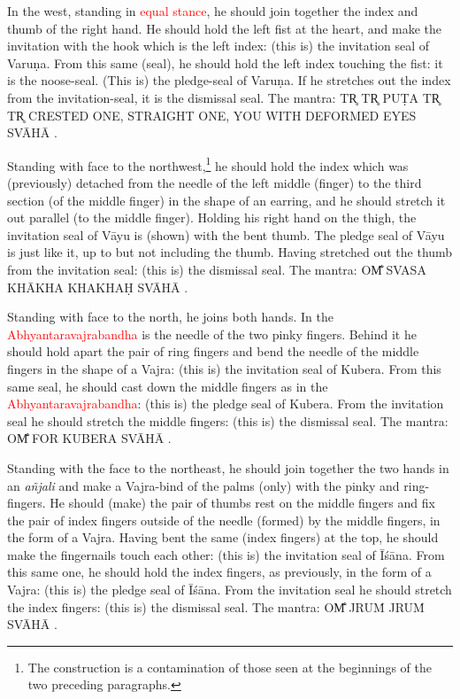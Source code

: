 \documentclass[11pt]{book}
\makeatletter
\def\fakesc#1{%
  \begingroup%
  \xdef\fake@name{\csname\curr@fontshape/\f@size\endcsname}%
  \fontsize{1.3\fontdimen8\fake@name}{\baselineskip}\selectfont%
  \uppercase{#1}%
  \endgroup%
}
\newcommand{\mantra}[1]{\fakesc{#1}}
\newcommand{\red}[1]{\textcolor{red}{#1}}
\newcommand{\skt}[1]{\emph{#1}}
\makeatother
\begin{document}
In the west, standing in \red{equal stance}, he should join together the index and thumb of the right hand.  He should hold the left fist at the heart, and make the invitation with the hook which is the left index: (this is) the invitation seal of Varuṇa. From this same (seal), he should hold the left index touching the fist: it is the noose-seal. (This is) the pledge-seal of Varuṇa. If he stretches out the index from the invitation-seal, it is the dismissal seal. The mantra: \mantra{tr̥ tr̥ puṭa tr̥ tr̥ crested one, straight one, you with deformed eyes svāhā}.

Standing with face to the northwest,\footnote{The construction is a contamination of those seen at the beginnings of the two preceding paragraphs.} he should hold the index which was (previously) detached from the needle of the left middle (finger) to the third section (of the middle finger) in the shape of an earring, and he should stretch it out parallel (to the middle finger). Holding his right hand on the thigh, the invitation seal of Vāyu is (shown) with the bent thumb. The pledge seal of Vāyu is just like it, up to but not including the thumb. Having stretched out the thumb from the invitation seal: (this is) the dismissal seal. The mantra: \mantra{om̐ svasa khākha khakhaḥ svāhā}.

Standing with face to the north, he joins both hands. In the \red{Abhyantaravajrabandha} is the needle of the two pinky fingers. Behind it he should hold apart the pair of ring fingers and bend the needle of the middle fingers in the shape of a Vajra: (this is) the invitation seal of Kubera. From this same seal, he should cast down the middle fingers as in the \red{Abhyantaravajrabandha}: (this is) the pledge seal of Kubera. From the invitation seal he should stretch the middle fingers: (this is) the dismissal seal. The mantra: \mantra{om̐ for Kubera svāhā}.

Standing with the face to the northeast, he should join together the two hands in an \skt{añjali} and make a Vajra-bind of the palms (only) with the pinky and ring-fingers. He should (make) the pair of thumbs rest  on the middle fingers and fix the pair of index fingers outside of the needle (formed) by the middle fingers, in the form of a Vajra. Having bent the same (index fingers) at the top, he should make the fingernails touch each other: (this is) the invitation seal of Īśāna. From this same one, he should hold the index fingers, as previously, in the form of a Vajra: (this is) the pledge seal of Īśāna. From the invitation seal he should stretch the index fingers: (this is) the dismissal seal. The mantra: \mantra{om̐ jruṁ jruṁ svāhā}.
\end{document}
